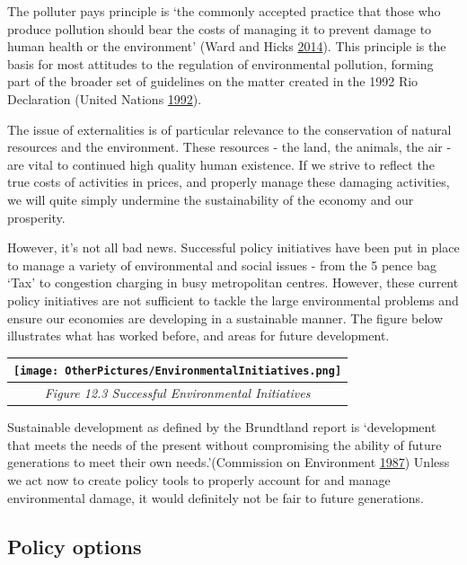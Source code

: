 \documentclass[]{tufte-handout}
\begin{document}
The polluter pays principle is `the commonly accepted practice that
those who produce pollution should bear the costs of managing it to
prevent damage to human health or the environment' (Ward and Hicks
\protect\hyperlink{ref-GranthamResearchInstituteonclimatechangeandtheenvironment2014}{2014}).
This principle is the basis for most attitudes to the regulation of
environmental pollution, forming part of the broader set of guidelines
on the matter created in the 1992 Rio Declaration (United Nations
\protect\hyperlink{ref-UnitedNations1992}{1992}).

The issue of externalities is of particular relevance to the
conservation of natural resources and the environment. These resources -
the land, the animals, the air - are vital to continued high quality
human existence. If we strive to reflect the true costs of activities in
prices, and properly manage these damaging activities, we will quite
simply undermine the sustainability of the economy and our prosperity.

However, it's not all bad news. Successful policy initiatives have been
put in place to manage a variety of environmental and social issues -
from the 5 pence bag `Tax' to congestion charging in busy metropolitan
centres. However, these current policy initiatives are not sufficient to
tackle the large environmental problems and ensure our economies are
developing in a sustainable manner. The figure below illustrates what
has worked before, and areas for future development.

\begin{longtable}[]{@{}c@{}}
\toprule
\texttt{[image: OtherPictures/EnvironmentalInitiatives.png]}\tabularnewline
\midrule
\endhead
\emph{Figure 12.3 Successful Environmental Initiatives}\tabularnewline
\bottomrule
\end{longtable}

Sustainable development as defined by the Brundtland report is
`development that meets the needs of the present without compromising
the ability of future generations to meet their own needs.'(Commission
on Environment \protect\hyperlink{ref-CommissiononEnvironment}{1987})
Unless we act now to create policy tools to properly account for and
manage environmental damage, it would definitely not be fair to future
generations.

\hypertarget{policy-options}{%
\subsection{Policy options}\label{policy-options}}
\end{document}
